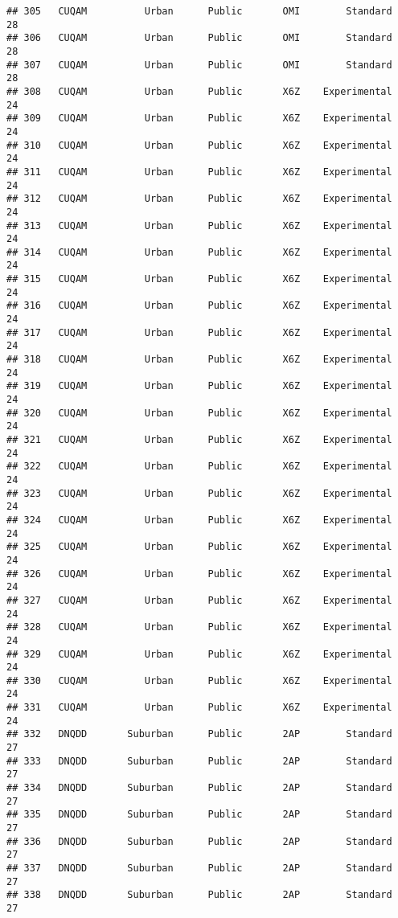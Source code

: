 \documentclass[
]{article}
\begin{document}
\begin{verbatim}
## 305   CUQAM          Urban      Public       OMI        Standard        28
## 306   CUQAM          Urban      Public       OMI        Standard        28
## 307   CUQAM          Urban      Public       OMI        Standard        28
## 308   CUQAM          Urban      Public       X6Z    Experimental        24
## 309   CUQAM          Urban      Public       X6Z    Experimental        24
## 310   CUQAM          Urban      Public       X6Z    Experimental        24
## 311   CUQAM          Urban      Public       X6Z    Experimental        24
## 312   CUQAM          Urban      Public       X6Z    Experimental        24
## 313   CUQAM          Urban      Public       X6Z    Experimental        24
## 314   CUQAM          Urban      Public       X6Z    Experimental        24
## 315   CUQAM          Urban      Public       X6Z    Experimental        24
## 316   CUQAM          Urban      Public       X6Z    Experimental        24
## 317   CUQAM          Urban      Public       X6Z    Experimental        24
## 318   CUQAM          Urban      Public       X6Z    Experimental        24
## 319   CUQAM          Urban      Public       X6Z    Experimental        24
## 320   CUQAM          Urban      Public       X6Z    Experimental        24
## 321   CUQAM          Urban      Public       X6Z    Experimental        24
## 322   CUQAM          Urban      Public       X6Z    Experimental        24
## 323   CUQAM          Urban      Public       X6Z    Experimental        24
## 324   CUQAM          Urban      Public       X6Z    Experimental        24
## 325   CUQAM          Urban      Public       X6Z    Experimental        24
## 326   CUQAM          Urban      Public       X6Z    Experimental        24
## 327   CUQAM          Urban      Public       X6Z    Experimental        24
## 328   CUQAM          Urban      Public       X6Z    Experimental        24
## 329   CUQAM          Urban      Public       X6Z    Experimental        24
## 330   CUQAM          Urban      Public       X6Z    Experimental        24
## 331   CUQAM          Urban      Public       X6Z    Experimental        24
## 332   DNQDD       Suburban      Public       2AP        Standard        27
## 333   DNQDD       Suburban      Public       2AP        Standard        27
## 334   DNQDD       Suburban      Public       2AP        Standard        27
## 335   DNQDD       Suburban      Public       2AP        Standard        27
## 336   DNQDD       Suburban      Public       2AP        Standard        27
## 337   DNQDD       Suburban      Public       2AP        Standard        27
## 338   DNQDD       Suburban      Public       2AP        Standard        27

\end{verbatim}
\end{document}
